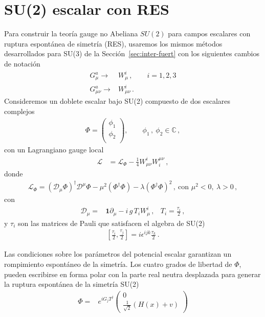 \section{SU(2) escalar con RES}
\begin{frame}
Para construir la teoría gauge no Abeliana $SU(2)$ para campos escalares con ruptura espontánea de simetría (RES), usaremos los mismos métodos desarrollados para SU(3) de la Sección~\ref{sec:inter-fuert} con los siguientes cambios de notación
\begin{align}
  G_{\mu}^a \to& W_{\mu}^{i}\,,\qquad i=1,2,3 \nonumber\\
  G_{\mu\nu}^a \to& W_{\mu\nu}^{i}\,.
\end{align}
Consideremos un doblete escalar bajo SU(2) compuesto de dos escalares complejos
\begin{align}
  \Phi=  \begin{pmatrix}
    \phi_1\\
     \phi_2\\
  \end{pmatrix},\qquad \phi_1\,,\ \phi_2\in \mathbb{C}\,,
\end{align}
con un Lagrangiano gauge local
\begin{align}
  \mathcal{L}&=\mathcal{L}_\Phi-\frac{1}{4}W_{\mu\nu}^{i}W^{\mu\nu}_i\,,
\end{align}
donde
\begin{align}
  \label{eq:lagsu2scalar}
 \mathcal{L}_\Phi= \left( \mathcal{D}_{\mu} \Phi\right)^{\dagger}\mathcal{D}^{\mu} \Phi-
\mu^2 \left( \Phi^{\dagger} \Phi\right)-\lambda \left( \Phi^{\dagger} \Phi\right)^2\,,\ \text{con $\mu^2<0,\ \lambda>0$}\,,
\end{align}
con
\begin{align}
  \mathcal{D}_{\mu}=&\boldsymbol{1}\partial_{\mu}-i\,g\,T_i W^i_{\mu}\,,& T_i=\frac{\tau_i}{2}\,,
\end{align}
y $\tau_i$ son las matrices de Pauli que satisfacen el algebra de SU(2)
\begin{align}
  \left[ \frac{\tau_i}{2},\frac{\tau_j}{2} \right]=i\epsilon^{ijk}\frac{\tau_k}{2}\,.
\end{align}

Las condiciones sobre los parámetros del potencial escalar garantizan un rompimiento espontáneo de la simetría. Los cuatro grados de libertad de $\Phi$, pueden escribirse en forma polar con la parte real neutra desplazada para generar la ruptura espontánea de la simetría SU(2)
\begin{align}
\label{eq:92qft}
  {\Phi}=&e^{i G_jT^j}
  \begin{pmatrix}
    0\\
    \frac{1}{\sqrt{2}}(H(x)+v)
  \end{pmatrix}\\
\end{align}
\end{frame}
